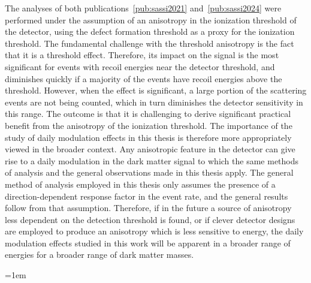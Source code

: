\documentclass[b5paper, 10pt, twoside]{book}
\begin{document}
The analyses of both publications~\ref{pub:sassi2021} and~\ref{pub:sassi2024} were performed under the assumption of an anisotropy in the ionization threshold of the detector, using the defect formation threshold as a proxy for the ionization threshold. The fundamental challenge with the threshold anisotropy is the fact that it is a threshold effect. Therefore, its impact on the signal is the most significant for events with recoil energies near the detector threshold, and diminishes quickly if a majority of the events have recoil energies above the threshold. However, when the effect is significant, a large portion of the scattering events are not being counted, which in turn diminishes the detector sensitivity in this range. The outcome is that it is challenging to derive significant practical benefit from the anisotropy of the ionization threshold. The importance of the study of daily modulation effects in this thesis is therefore more appropriately viewed in the broader context. Any anisotropic feature in the detector can give rise to a daily modulation in the dark matter signal to which the same methods of analysis and the general observations made in this thesis apply. The general method of analysis employed in this thesis only assumes the presence of a direction-dependent response factor in the event rate, and the general results follow from that assumption. Therefore, if in the future a source of anisotropy less dependent on the detection threshold is found, or if clever detector designs are employed to produce an anisotropy which is less sensitive to energy, the daily modulation effects studied in this work will be apparent in a broader range of energies for a broader range of dark matter masses.

\backmatter

\emergencystretch=1em
\printbibliography[heading = bibintoc, title = References]
\end{document}
